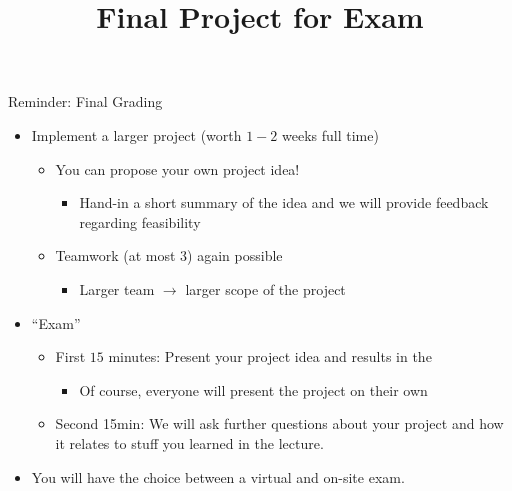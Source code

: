 \documentclass[aspectratio=169]{../latex_main/tntbeamer}  %
\title[RL: Exam]{Final Project for Exam}
\begin{document}
	
	\maketitle

\begin{frame}[c]{Reminder: Final Grading}
	
	\begin{itemize}
		\item Implement a larger project (worth $1-2$ weeks full time)
		\begin{itemize}
			\item You can propose your own project idea!
			\begin{itemize}
				\item Hand-in a short summary of the idea and we will provide feedback regarding feasibility
			\end{itemize}
			\item Teamwork (at most 3) again possible
			\begin{itemize}
				\item Larger team $\to$ larger scope of the project
			\end{itemize}
		\end{itemize}
		\item ``Exam''
		\begin{itemize}
			\item First $15$ minutes: Present your project idea and results in the 
			\begin{itemize}
				\item Of course, everyone will present the project on their own
			\end{itemize}
			\item Second 15min: We will ask further questions about your project and how it relates to stuff you learned in the lecture.
		\end{itemize}	
		\item You will have the choice between a virtual and on-site exam.
	\end{itemize}
	
\end{frame}
\end{document}
